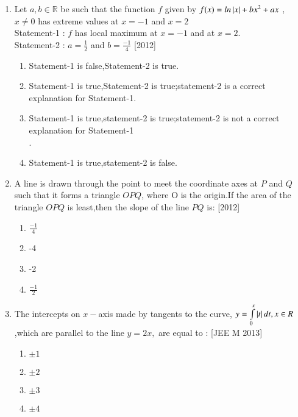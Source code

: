 \documentclass[journal,12pt,twocolumn]{IEEEtran}
\theoremstyle{remark}
\begin{document}
\begin{enumerate}
\item Let $a,b\in \mathbb R$ be such that the function $f$ given by $f(x)=ln\left\vert x\right\vert+bx^{2}+ax$ , $x \neq 0$ has extreme values at $x=-1$ and $x=2$\\
Statement-1 : $f$ has local maximum at $x=-1$ and at $x=2$.\\
Statement-2 : $a=\frac{1}{2}$ and $b=\frac{-1}{4}$ \hfill{[2012]}\\
\begin{enumerate}
    \item Statement-1 is false,Statement-2 is true.\\
    \item Statement-1 is true,Statement-2 is true;statement-2 is a correct explanation for Statement-1.\\
    \item Statement-1 is true,statement-2 is true;statement-2 is not a correct explanation for Statement-1\\.
    \item Statement-1 is true,statement-2 is false.\\
\end{enumerate}

\item A line is drawn through the point to meet the coordinate axes at $P$ and $Q$ such that it forms a triangle $OPQ$, where O is the origin.If the area of the triangle $OPQ$ is least,then the slope of the line $PQ$ is: \hfill{[2012]}\\
\begin{enumerate}
    \item  $\frac{-1}{4}$\\
    \item  -4\\
    \item  -2\\
    \item  $\frac{-1}{2}$\\
\end{enumerate}
\item The intercepts on $x-$axis made by tangents to the curve, $y=\int\limits_0^x\left\vert t\right\vert dt,x\in R$,which are parallel to the line $y=2x,$ are equal to : {[JEE M 2013]}\\
\begin{enumerate}
    \item  $\pm1$\\
    \item  $\pm2$\\
    \item  $\pm3$\\
    \item  $\pm4$\\
    

\end{enumerate}
\end{enumerate}
\end{document}
